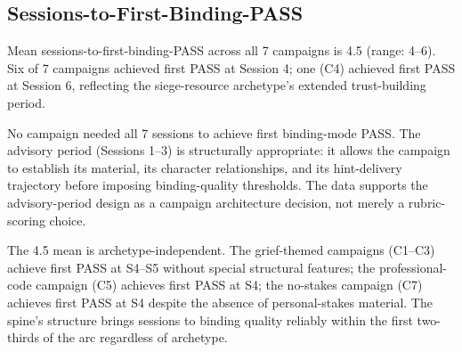 \subsection{Sessions-to-First-Binding-PASS}

Mean sessions-to-first-binding-PASS across all 7 campaigns is 4.5 (range: 4--6).
Six of 7 campaigns achieved first PASS at Session 4; one (C4) achieved first PASS
at Session 6, reflecting the siege-resource archetype's extended trust-building period.

No campaign needed all 7 sessions to achieve first binding-mode PASS. The
advisory period (Sessions 1--3) is structurally appropriate: it allows the campaign
to establish its material, its character relationships, and its hint-delivery
trajectory before imposing binding-quality thresholds. The data supports the
advisory-period design as a campaign architecture decision, not merely a
rubric-scoring choice.

The 4.5 mean is archetype-independent. The grief-themed campaigns (C1--C3) achieve
first PASS at S4--S5 without special structural features; the professional-code
campaign (C5) achieves first PASS at S4; the no-stakes campaign (C7) achieves
first PASS at S4 despite the absence of personal-stakes material. The spine's
structure brings sessions to binding quality reliably within the first two-thirds
of the arc regardless of archetype.
